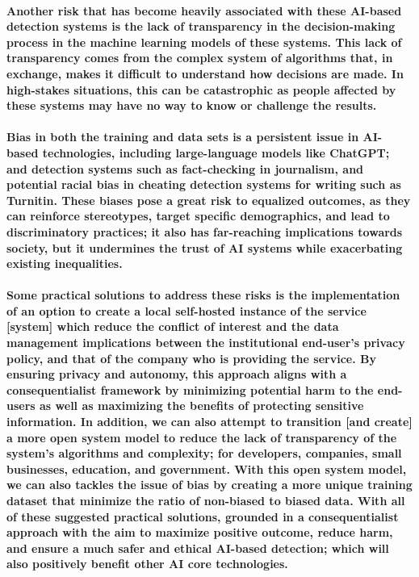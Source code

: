\documentclass[12pt,letterpaper,final]{report}
\begin{document}
\paragraph{
Another risk that has become heavily associated with these AI-based detection systems is the lack of transparency in the decision-making process in the machine learning models of these systems. This lack of transparency comes from the complex system of algorithms that, in exchange, makes it difficult to understand how decisions are made. In high-stakes situations, this can be catastrophic as people affected by these systems may have no way to know or challenge the results.
}
\paragraph{
Bias in both the training and data sets is a persistent issue in AI-based technologies, including large-language models like ChatGPT; and detection systems such as fact-checking in journalism, and potential racial bias in cheating detection systems for writing such as Turnitin. These biases pose a great risk to equalized outcomes, as they can reinforce stereotypes, target specific demographics, and lead to discriminatory practices; it also has far-reaching implications towards society, but it undermines the trust of AI systems while exacerbating existing inequalities. 
}
\paragraph{
Some practical solutions to address these risks is the implementation of an option to create a local self-hosted instance of the service [system] which reduce the conflict of interest and the data management implications between the institutional end-user's privacy policy, and that of the company who is providing the service. By ensuring privacy and autonomy, this approach aligns with a consequentialist framework by minimizing potential harm to the end-users as well as maximizing the benefits of protecting sensitive information. In addition, we can also attempt to transition [and create] a more open system model to reduce the lack of transparency of the system's algorithms and complexity; for developers, companies, small businesses, education, and government. With this open system model, we can also tackles the issue of bias by creating a more unique training dataset that minimize the ratio of non-biased to biased data. With all of these suggested practical solutions, grounded in a consequentialist approach with the aim to maximize positive outcome, reduce harm, and ensure a much safer and ethical AI-based detection; which will also positively benefit other AI core technologies.
}
\end{document}
